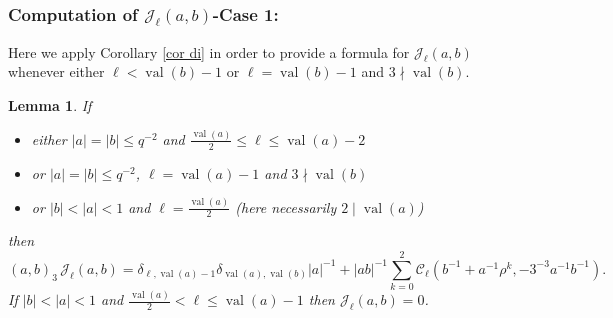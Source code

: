 \documentclass[12pt]{amsart}
\newcommand{\abs}[1]{\left|{#1}\right|}
\newcommand{\J}{\mathcal{J}}
\newcommand{\val}{{\operatorname{val}}}
\newcommand{\Cu}{\mathcal{C}}
\newtheorem{lemma}[theorem]{Lemma}
\theoremstyle{remark}
\begin{document}
\subsubsection{Computation of $\J_\ell(a,b)$-Case 1:} Here we apply Corollary \ref{cor di} in order to provide a formula for $\J_\ell(a,b)$ whenever 
either $\ell<\val(b)-1$ or $\ell=\val(b)-1$ and $3\nmid \val(b)$.
\begin{lemma}\label{lem ji}
If 
\begin{itemize}
\item either $\abs{a}=\abs{b}\le q^{-2}$ and $ \frac{\val(a)}2\le \ell\le \val(a)-2$ 
\item or  $\abs{a}=\abs{b}\le q^{-2}$, $\ell=\val(a)-1$ and $3\nmid \val(b)$ 
\item or $\abs{b}<\abs{a}<1$ and $\ell=\frac{\val(a)}2$ (here necessarily $2\mid\val(a)$)
\end{itemize}
then
\[
(a,b)_3\,\J_\ell(a,b)=
\delta_{\ell,\val(a)-1}\delta_{\val(a),\val(b)}\abs{a}^{-1}+\abs{ab}^{-1}\sum_{k=0}^2 \Cu_\ell(b^{-1}+a^{-1}\rho^k,-3^{-3}a^{-1}b^{-1}).
\]
If $\abs{b}<\abs{a}<1$ and $\frac{\val(a)}2< \ell \le \val(a)-1$ then $\J_\ell(a,b)=0$.
\end{lemma}
\end{document}
